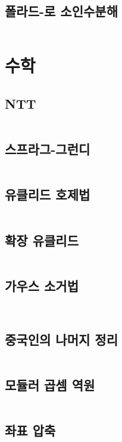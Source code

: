\documentclass{article}
\begin{document}
\begin{multicols}{2}
\subsection{폴라드-로 소인수분해}
\inputminted[linenos, breaklines]{python}{codes/pollard-rho.py}

\section{수학}
\subsection{NTT}
\inputminted[linenos, breaklines]{python}{codes/ntt.py}
\subsection{스프라그-그런디}
\inputminted[linenos, breaklines]{python}{codes/nim.py}
\subsection{유클리드 호제법}
\inputminted[linenos, breaklines]{cpp}{codes/euclid.cpp}
\subsection{확장 유클리드}
\inputminted[linenos, breaklines]{python}{codes/eea.py}

\subsection{가우스 소거법}
\inputminted[linenos, breaklines]{cpp}{codes/SLAE.cpp}
\inputminted[linenos, breaklines]{cpp}{codes/SLAE_bit.cpp}

\subsection{중국인의 나머지 정리}
\inputminted[linenos, breaklines]{cpp}{codes/crt.cpp}
\subsection{모듈러 곱셈 역원}
\inputminted[linenos, breaklines]{python}{codes/modular.py}
\subsection{좌표 압축}
\inputminted[linenos, breaklines]{python}{codes/comp.py}


\end{multicols}
\end{document}
